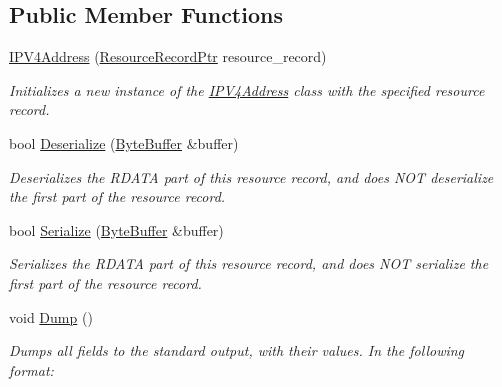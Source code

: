 \subsection*{Public Member Functions}
\begin{DoxyCompactItemize}
\item 
\hyperlink{class_senergy_1_1_dns_1_1_records_1_1_i_p_v4_address_a71d523f7516849bf8e43981d5ec44ca8}{I\-P\-V4\-Address} (\hyperlink{namespace_senergy_1_1_dns_a1fa04259a07ce7a270e09288aa456ffd}{Resource\-Record\-Ptr} resource\-\_\-record)
\begin{DoxyCompactList}\small\item\em Initializes a new instance of the \hyperlink{class_senergy_1_1_dns_1_1_records_1_1_i_p_v4_address}{I\-P\-V4\-Address} class with the specified resource record. \end{DoxyCompactList}\item 
bool \hyperlink{class_senergy_1_1_dns_1_1_records_1_1_i_p_v4_address_a8de88ac0b61886638f63dd4930b07b36}{Deserialize} (\hyperlink{class_senergy_1_1_byte_buffer}{Byte\-Buffer} \&buffer)
\begin{DoxyCompactList}\small\item\em Deserializes the R\-D\-A\-T\-A part of this resource record, and does N\-O\-T deserialize the first part of the resource record. \end{DoxyCompactList}\item 
bool \hyperlink{class_senergy_1_1_dns_1_1_records_1_1_i_p_v4_address_ab080902a8a40e1933d327ff95298a996}{Serialize} (\hyperlink{class_senergy_1_1_byte_buffer}{Byte\-Buffer} \&buffer)
\begin{DoxyCompactList}\small\item\em Serializes the R\-D\-A\-T\-A part of this resource record, and does N\-O\-T serialize the first part of the resource record. \end{DoxyCompactList}\item 
void \hyperlink{class_senergy_1_1_dns_1_1_records_1_1_i_p_v4_address_a6d45ba035f7ff475f78a29593a6af0d5}{Dump} ()
\begin{DoxyCompactList}\small\item\em Dumps all fields to the standard output, with their values. In the following format\-: \end{DoxyCompactList}\end{DoxyCompactItemize}
